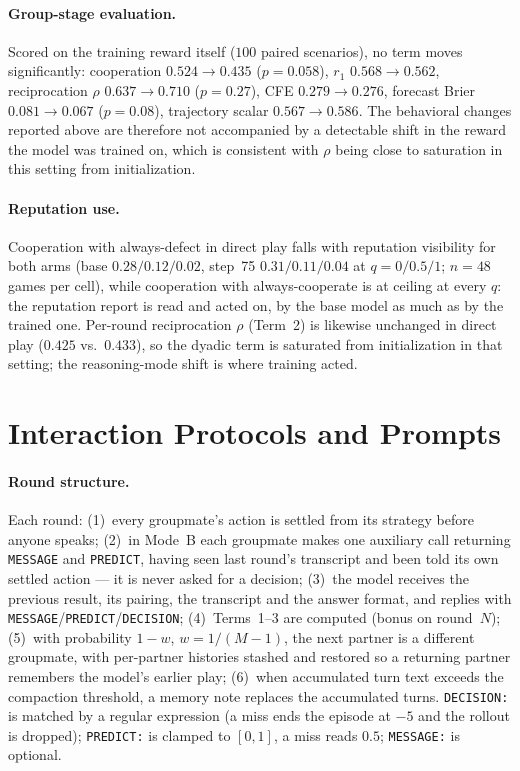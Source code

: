 \documentclass{article}
\begin{document}
\paragraph{Group-stage evaluation.} Scored on the training reward itself
($100$ paired scenarios), no term moves significantly: cooperation
$0.524\to0.435$ ($p{=}0.058$), $r_1$ $0.568\to0.562$, reciprocation $\rho$
$0.637\to0.710$ ($p{=}0.27$), CFE $0.279\to0.276$, forecast Brier
$0.081\to0.067$ ($p{=}0.08$), trajectory scalar $0.567\to0.586$. The behavioral
changes reported above are therefore not accompanied by a detectable shift in
the reward the model was trained on, which is consistent with $\rho$ being
close to saturation in this setting from initialization.

\paragraph{Reputation use.} Cooperation with always-defect in direct play
falls with reputation visibility for both arms (base $0.28/0.12/0.02$, step~75
$0.31/0.11/0.04$ at $q=0/0.5/1$; $n=48$ games per cell), while cooperation
with always-cooperate is at ceiling at every $q$: the reputation report is
read and acted on, by the base model as much as by the trained one. Per-round
reciprocation $\rho$ (Term~2) is likewise unchanged in direct play ($0.425$
vs.\ $0.433$), so the dyadic term is saturated from initialization in that
setting; the reasoning-mode shift is where training acted.

\section{Interaction Protocols and Prompts}
\label{app:prompts}

\paragraph{Round structure.} Each round: (1)~every groupmate's action is
settled from its strategy before anyone speaks; (2)~in Mode~B each
groupmate makes one auxiliary call returning \texttt{MESSAGE} and
\texttt{PREDICT}, having seen last round's transcript and been told its own
settled action --- it is never asked for a decision; (3)~the model receives
the previous result, its pairing, the transcript and the answer format, and
replies with \texttt{MESSAGE}/\texttt{PREDICT}/\texttt{DECISION};
(4)~Terms~1--3 are computed (bonus on round~$N$); (5)~with probability
$1-w$, $w=1/(M-1)$, the next partner is a different groupmate, with
per-partner histories stashed and restored so a returning partner
remembers the model's earlier play; (6)~when accumulated turn text exceeds
the compaction threshold, a memory note replaces the accumulated turns.
\texttt{DECISION:} is matched by a regular expression (a miss ends the
episode at $-5$ and the rollout is dropped); \texttt{PREDICT:} is clamped
to $[0,1]$, a miss reads $0.5$; \texttt{MESSAGE:} is optional.
\end{document}
